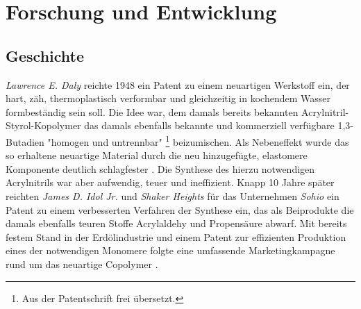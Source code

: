 \chapter{Forschung und Entwicklung}
    \section{Geschichte}\label{sec:geschichte}
        \textit{Lawrence E. Daly} reichte 1948 ein Patent zu einem neuartigen Werkstoff ein, der hart, zäh, thermoplastisch verformbar
        und gleichzeitig in kochendem Wasser formbeständig sein soll. Die Idee war, dem damals bereits bekannten Acrylnitril-Styrol-Kopolymer
        das damals ebenfalls bekannte und kommerziell verfügbare 1,3-Butadien "homogen und untrennbar" \footnote{Aus der Patentschrift frei übersetzt.}
        beizumischen. Als Nebeneffekt wurde das so erhaltene neuartige Material durch die neu hinzugefügte, elastomere Komponente
        deutlich schlagfester \cite{ABS.patent.1948.Daly.10191946}.
        \medskip
        Die Synthese des hierzu notwendigen Acrylnitrils war aber aufwendig, teuer und ineffizient. Knapp 10 Jahre später
        reichten \textit{James D. Idol Jr.} und \textit{Shaker Heights} für das Unternehmen \textit{Sohio} ein Patent zu einem verbesserten Verfahren
        der Synthese ein, das als Beiprodukte die damals ebenfalls teuren Stoffe Acrylaldehy und Propensäure abwarf. Mit
        bereits festem Stand in der Erdölindustrie und einem Patent zur effizienten Produktion eines der notwendigen Monomere        
        folgte eine umfassende Marketingkampagne rund um das neuartige Copolymer \cite{history.of.sohio.process.booklet.2021,sohio.process.patent.1959.9201957}.
        
